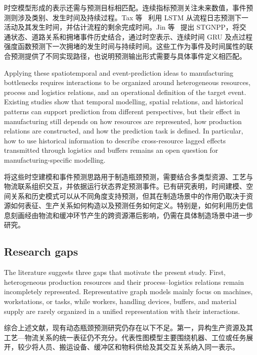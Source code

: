\documentclass[a4paper,fleqn]{cas-dc}
\newcommand{\zhpara}[1]{%
  \par\begingroup\small\color{black!72}\noindent #1\par\endgroup}
\begin{document}
\zhpara{时空模型形成的表示还需与预测目标相匹配。连续指标预测关注未来数值，事件预测则涉及类别、发生时间及持续过程。Tax 等~\cite{tax2017predictive} 利用 LSTM 从流程日志预测下一活动及其发生时间，并估计流程的剩余完成时间。Jin 等~\cite{jin2023stgnpp} 提出 STGNPP，将交通状态、道路关系和拥堵事件历史结合，通过时空表示、连续时间 GRU 及点过程强度函数预测下一次拥堵的发生时间与持续时间。这些工作为事件及时间属性的联合预测提供了不同实现路径，也说明预测输出形式需要与具体事件定义相匹配。}

Applying these spatiotemporal and event-prediction ideas to manufacturing bottlenecks requires interactions to be organized around heterogeneous resources, process and logistics relations, and an operational definition of the target event. Existing studies show that temporal modelling, spatial relations, and historical patterns can support prediction from different perspectives, but their effect in manufacturing still depends on how resources are represented, how production relations are constructed, and how the prediction task is defined. In particular, how to use historical information to describe cross-resource lagged effects transmitted through logistics and buffers remains an open question for manufacturing-specific modelling.

\zhpara{将这些时空建模和事件预测思路用于制造瓶颈预测，需要结合多类型资源、工艺与物流联系组织交互，并依据运行状态界定预测事件。已有研究表明，时间建模、空间关系和历史模式可以从不同角度支持预测，但其在制造场景中的作用仍取决于资源如何表征、生产关系如何构造以及预测任务如何定义。特别是，如何利用历史信息刻画经由物流和缓冲环节产生的跨资源滞后影响，仍需在具体制造场景中进一步研究。}

\subsection{Research gaps}

The literature suggests three gaps that motivate the present study. First, heterogeneous production resources and their process--logistics relations remain incompletely represented. Representative graph models mainly focus on machines, workstations, or tasks, while workers, handling devices, buffers, and material supply are rarely organized in a unified representation with their interactions.

\zhpara{综合上述文献，现有动态瓶颈预测研究仍存在以下不足。第一，异构生产资源及其工艺—物流关系的统一表征仍不充分。代表性图模型主要围绕机器、工位或任务展开，较少将人员、搬运设备、缓冲区和物料供给及其交互关系纳入同一表示。}
\end{document}
